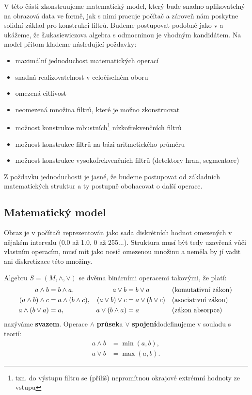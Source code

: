     V této části zkonstruujeme matematický model, který bude snadno aplikovatelný na obrazová data ve formě, jak s nimi pracuje počítač a zároveň nám poskytne solidní základ pro konstrukci filtrů. Budeme postupovat podobně jako v \cite{MajerovaPhD} a ukážeme, že \L ukasiewiczova algebra s odmocninou je vhodným kandidátem. Na model přitom klademe následující poždavky:
    \begin{itemize}
      \item maximální jednoduchost matematických operací
      \item snadná realizovatelnost v celočíselném oboru
      \item omezená citlivost
      \item neomezená množina filtrů, které je možno zkonstruovat
      \item možnost konstrukce robustních\footnote{tzn. do výstupu filtru se (příliš) nepromítnou okrajové extrémní hodnoty ze vstupu} nízkofrekvenčních filtrů
      \item možnost konstrukce filtrů na bázi aritmetického průměru
      \item možnost konstrukce vysokofrekvenčních filtrů (detektory hran, segmentace)
    \end{itemize}
    Z poždavku jednoduchosti je jasné, že budeme postupovat od základních matematických struktur a ty postupně obohacovat o další operace.

    \subsection{Matematický model}

    Obraz je v počítači reprezentován jako sada diskrétních hodnot omezených v nějakém intervalu (0.0 až 1.0, 0 až 255...). Struktura musí být tedy uzavřená vůči vlastním operacím, musí mít jako nosič omezenou množinu a neměla by jí vadit ani diskretizace této množiny.

    \begin{define}\label{svaz}
    Algebru $S = (M,\wedge,\vee)$ se dvěma binárními operacemi takovými, že platí:
    \begin{align}
    a \wedge b &= b \wedge a, & a \vee b &= b \vee a &&\text{\textup{(}komutativní zákon\textup{)\,}} \\
    (a \wedge b) \wedge c &= a \wedge (b \wedge c), & (a \vee b) \vee c &= a \vee (b \vee c) &&\text{\textup{(}asociativní zákon\textup{)\,}} \\
    a \wedge (b \vee a) &= a,& a \vee (b \wedge a) &= a &&\text{\textup{(}zákon absorpce\textup{)\,}}
    \end{align}
    nazýváme \textbf{svazem}. Operace $\wedge$ \rl\textbf{průsek}\rr a $\vee$ \rl\textbf{spojení}\rr dodefinujeme v souladu s teorií:
    \begin{align}
    a \wedge b &= \min(a,b), \\
    a \vee b &= \max(a,b).
    \end{align}
    \end{define}

